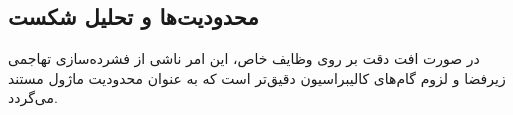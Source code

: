 \subsection{محدودیت‌ها و تحلیل شکست}
در صورت افت دقت بر روی وظایف خاص، این امر ناشی از فشرده‌سازی تهاجمی زیرفضا و لزوم گام‌های کالیبراسیون دقیق‌تر است که به عنوان محدودیت ماژول مستند می‌گردد.
